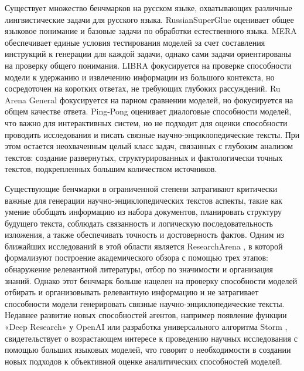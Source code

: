 \documentclass{article}
\begin{document}
Существует множество бенчмарков на русском языке, охватывающих различные лингвистические задачи для русского языка.
RussianSuperGlue \cite{rsglue} оценивает общее языковое понимание и базовые задачи по обработки естественного языка. 
MERA \cite{mera} обеспечивает единые условия тестирования моделей за счет составления инструкций к генерации для каждой задачи, однако сами задачи ориентированы на проверку общего понимания. 
LIBRA \cite{libra} фокусируется на проверке способности модели к удержанию и извлечению информации из большого контекста, но сосредоточен на коротких ответах, не требующих глубоких рассуждений. 
Ru Arena General \cite{arena} фокусируется на парном сравнении моделей, но фокусируется на общем качестве ответа.
Ping-Pong \cite{pp} оценивает диалоговые способности моделей, что важно для интерактивных систем, но не подходит для оценки способности проводить исследования и писать связные научно-энциклопедические тексты.
При этом остается неохваченным целый класс задач, связанных с глубоким анализом текстов: создание развернутых, структурированных и фактологически точных текстов, подкрепленных большим количеством источников. 

Существующие бенчмарки в ограниченной степени затрагивают критически важные для генерации научно-энциклопедических текстов аспекты, 
такие как умение обобщать информацию из набора документов, планировать структуру будущего текста, соблюдать связанность и логическую последовательность изложения, а также обеспечивать точность и достоверность фактов. 
Одним из ближайших исследований в этой области является ResearchArena \cite{resar}, в которой формализуют построение академического обзора с помощью трех этапов:
обнаружение релевантной литературы, отбор по значимости и организация знаний. Однако этот бенчмарк больше нацелен на проверку способности моделей отбирать и организовывать релевантную информацию
и не затрагивает способности модели генерировать связные научно-энциклопедические тексты.
Недавнее развитие новых способностей агентов, например появление функции «Deep Research» у OpenAI \cite{deepr} или разработка  универсального алгоритма Storm \cite{storm}, 
свидетельствует о возрастающем интересе к проведению научных исследования с помощью больших языковых моделей, 
что говорит о необходимости в создании новых подходов к объективной оценке аналитических способностей моделей. 
\end{document}
